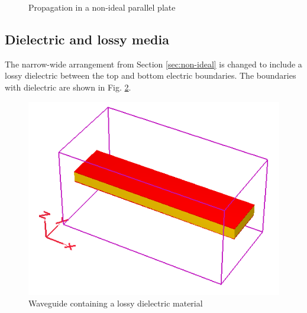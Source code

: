 \begin{figure}[htpb]
	\centering
	\caption{Propagation in a non-ideal parallel plate}
	\label{fig:non-ideal}
\end{figure} 

\subsection{Dielectric and lossy media}\label{sec:dielectric}
The narrow-wide arrangement from Section \ref{sec:non-ideal} is changed to include a lossy dielectric between the top and bottom electric boundaries.
The boundaries with dielectric are shown in Fig. \ref{fig:plate-with-es}.

\begin{figure}[tbph]
	\centering
	\includegraphics[width=0.7\linewidth]{graphics/plate-with-es}
	\caption{Waveguide containing a lossy dielectric material}
	\label{fig:plate-with-es}
\end{figure}

